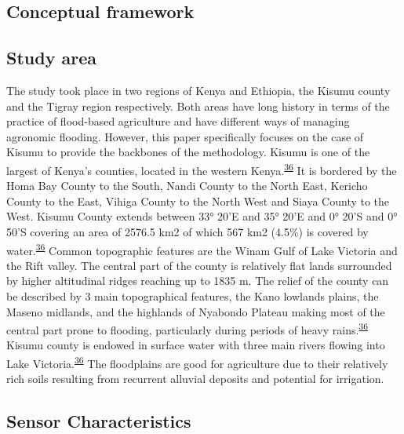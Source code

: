\documentclass[12pt,oneside]{article}
\begin{document}
\hypertarget{conceptual-framework}{%
\subsection{Conceptual framework}\label{conceptual-framework}}

\hypertarget{I1}{%
\subsection{Study area}\label{I1}}

The study took place in two regions of Kenya and Ethiopia, the Kisumu county and the Tigray region respectively. Both areas have long history in terms of the practice of flood-based agriculture and have different ways of managing agronomic flooding. However, this paper specifically focuses on the case of Kisumu to provide the backbones of the methodology. Kisumu is one of the largest of Kenya's counties, located in the western Kenya.\textsuperscript{\protect\hyperlink{ref-KisumuCountyGovernment_2013}{36}} It is bordered by the Homa Bay County to the South, Nandi County to the North East, Kericho County to the East, Vihiga County to the North West and Siaya County to the West. Kisumu County extends between 33° 20'E and 35° 20'E and 0° 20'S and 0° 50'S covering an area of 2576.5 km2 of which 567 km2 (4.5\%) is covered by water.\textsuperscript{\protect\hyperlink{ref-KisumuCountyGovernment_2013}{36}} Common topographic features are the Winam Gulf of Lake Victoria and the Rift valley. The central part of the county is relatively flat lands surrounded by higher altitudinal ridges reaching up to 1835 m. The relief of the county can be described by 3 main topographical features, the Kano lowlands plains, the Maseno midlands, and the highlands of Nyabondo Plateau making most of the central part prone to flooding, particularly during periods of heavy rains.\textsuperscript{\protect\hyperlink{ref-KisumuCountyGovernment_2013}{36}} Kisumu county is endowed in surface water with three main rivers flowing into Lake Victoria.\textsuperscript{\protect\hyperlink{ref-KisumuCountyGovernment_2013}{36}} The floodplains are good for agriculture due to their relatively rich soils resulting from recurrent alluvial deposits and potential for irrigation.

\hypertarget{I2}{%
\subsection{Sensor Characteristics}\label{I2}}
\end{document}
